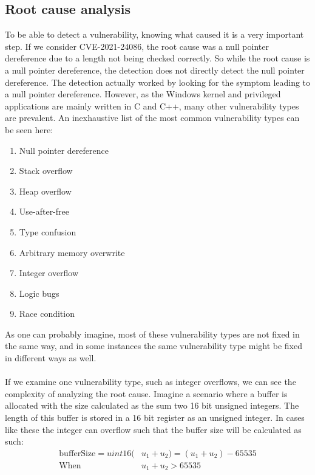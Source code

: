 \documentclass{report}
\begin{document}
\subsection{Root cause analysis}
To be able to detect a vulnerability, knowing what caused it is a very important step. If we consider CVE-2021-24086, the root cause was a null pointer dereference due to a length not being checked correctly. So while the root cause is a null pointer dereference, the detection does not directly detect the null pointer dereference. The detection actually worked by looking for the symptom leading to a null pointer dereference. However, as the Windows kernel and privileged applications are mainly written in C and C++, many other vulnerability types are prevalent. An inexhaustive list of the most common vulnerability types can be seen here:

\begin{enumerate}
    \item Null pointer dereference
    \item Stack overflow
    \item Heap overflow
    \item Use-after-free
    \item Type confusion
    \item Arbitrary memory overwrite
    \item Integer overflow
    \item Logic bugs
    \item Race condition
\end{enumerate}

As one can probably imagine, most of these vulnerability types are not fixed in the same way, and in some instances the same vulnerability type might be fixed in different ways as well.
\\
\\
If we examine one vulnerability type, such as integer overflows, we can see the complexity of analyzing the root cause. Imagine a scenario where a buffer is allocated with the size calculated as the sum two 16 bit unsigned integers. The length of this buffer is stored in a 16 bit register as an unsigned integer. In cases like these the integer can overflow such that the buffer size will be calculated as such:
\begin{align}
    \text{bufferSize} = uint16(&u_1 + u_2) = (u_1 + u_2) - 65535 \\
    \text{When }&u_1 + u_2 > 65535 \nonumber
\end{align}
\end{document}
